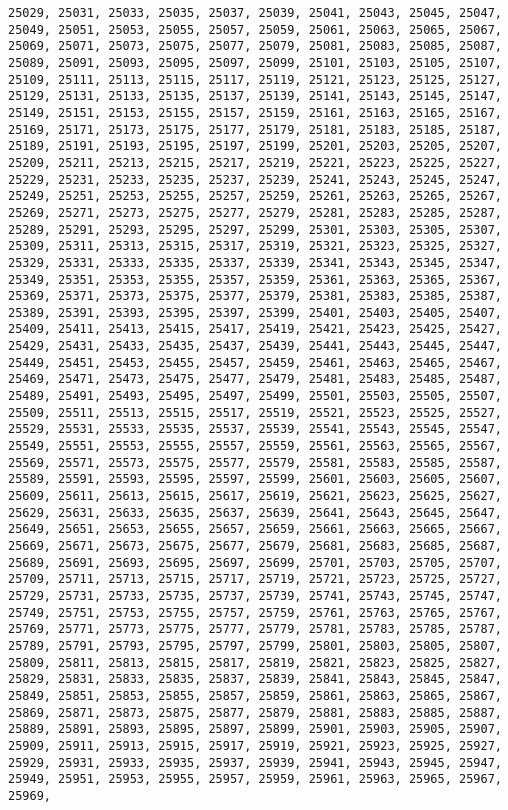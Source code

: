 \documentclass[11pt]{article}
\begin{document}
\begin{Verbatim}[commandchars=\\\{\}]
25029, 25031, 25033, 25035, 25037, 25039, 25041, 25043, 25045, 25047, 25049, 25051, 25053, 25055, 25057, 25059, 25061, 25063, 25065, 25067, 25069, 25071, 25073, 25075, 25077, 25079, 25081, 25083, 25085, 25087, 25089, 25091, 25093, 25095, 25097, 25099, 25101, 25103, 25105, 25107, 25109, 25111, 25113, 25115, 25117, 25119, 25121, 25123, 25125, 25127, 25129, 25131, 25133, 25135, 25137, 25139, 25141, 25143, 25145, 25147, 25149, 25151, 25153, 25155, 25157, 25159, 25161, 25163, 25165, 25167, 25169, 25171, 25173, 25175, 25177, 25179, 25181, 25183, 25185, 25187, 25189, 25191, 25193, 25195, 25197, 25199, 25201, 25203, 25205, 25207, 25209, 25211, 25213, 25215, 25217, 25219, 25221, 25223, 25225, 25227, 25229, 25231, 25233, 25235, 25237, 25239, 25241, 25243, 25245, 25247, 25249, 25251, 25253, 25255, 25257, 25259, 25261, 25263, 25265, 25267, 25269, 25271, 25273, 25275, 25277, 25279, 25281, 25283, 25285, 25287, 25289, 25291, 25293, 25295, 25297, 25299, 25301, 25303, 25305, 25307, 25309, 25311, 25313, 25315, 25317, 25319, 25321, 25323, 25325, 25327, 25329, 25331, 25333, 25335, 25337, 25339, 25341, 25343, 25345, 25347, 25349, 25351, 25353, 25355, 25357, 25359, 25361, 25363, 25365, 25367, 25369, 25371, 25373, 25375, 25377, 25379, 25381, 25383, 25385, 25387, 25389, 25391, 25393, 25395, 25397, 25399, 25401, 25403, 25405, 25407, 25409, 25411, 25413, 25415, 25417, 25419, 25421, 25423, 25425, 25427, 25429, 25431, 25433, 25435, 25437, 25439, 25441, 25443, 25445, 25447, 25449, 25451, 25453, 25455, 25457, 25459, 25461, 25463, 25465, 25467, 25469, 25471, 25473, 25475, 25477, 25479, 25481, 25483, 25485, 25487, 25489, 25491, 25493, 25495, 25497, 25499, 25501, 25503, 25505, 25507, 25509, 25511, 25513, 25515, 25517, 25519, 25521, 25523, 25525, 25527, 25529, 25531, 25533, 25535, 25537, 25539, 25541, 25543, 25545, 25547, 25549, 25551, 25553, 25555, 25557, 25559, 25561, 25563, 25565, 25567, 25569, 25571, 25573, 25575, 25577, 25579, 25581, 25583, 25585, 25587, 25589, 25591, 25593, 25595, 25597, 25599, 25601, 25603, 25605, 25607, 25609, 25611, 25613, 25615, 25617, 25619, 25621, 25623, 25625, 25627, 25629, 25631, 25633, 25635, 25637, 25639, 25641, 25643, 25645, 25647, 25649, 25651, 25653, 25655, 25657, 25659, 25661, 25663, 25665, 25667, 25669, 25671, 25673, 25675, 25677, 25679, 25681, 25683, 25685, 25687, 25689, 25691, 25693, 25695, 25697, 25699, 25701, 25703, 25705, 25707, 25709, 25711, 25713, 25715, 25717, 25719, 25721, 25723, 25725, 25727, 25729, 25731, 25733, 25735, 25737, 25739, 25741, 25743, 25745, 25747, 25749, 25751, 25753, 25755, 25757, 25759, 25761, 25763, 25765, 25767, 25769, 25771, 25773, 25775, 25777, 25779, 25781, 25783, 25785, 25787, 25789, 25791, 25793, 25795, 25797, 25799, 25801, 25803, 25805, 25807, 25809, 25811, 25813, 25815, 25817, 25819, 25821, 25823, 25825, 25827, 25829, 25831, 25833, 25835, 25837, 25839, 25841, 25843, 25845, 25847, 25849, 25851, 25853, 25855, 25857, 25859, 25861, 25863, 25865, 25867, 25869, 25871, 25873, 25875, 25877, 25879, 25881, 25883, 25885, 25887, 25889, 25891, 25893, 25895, 25897, 25899, 25901, 25903, 25905, 25907, 25909, 25911, 25913, 25915, 25917, 25919, 25921, 25923, 25925, 25927, 25929, 25931, 25933, 25935, 25937, 25939, 25941, 25943, 25945, 25947, 25949, 25951, 25953, 25955, 25957, 25959, 25961, 25963, 25965, 25967, 25969, 
\end{Verbatim}
\end{document}

